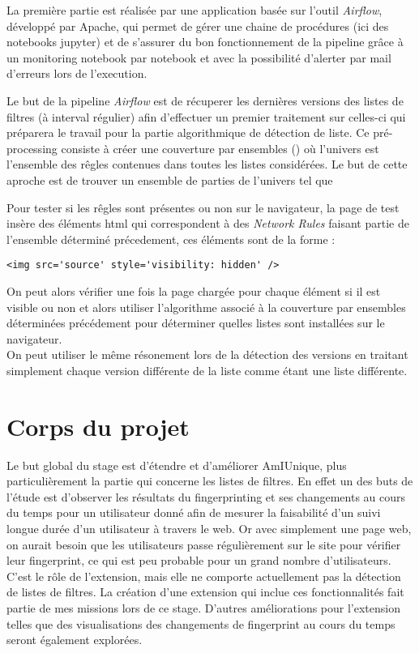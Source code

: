 \documentclass[oneside,a4paper,12pt]{article}
\begin{document}
La première partie est réalisée par une application basée sur l'outil \textit{Airflow}, développé par Apache, qui permet de gérer une chaine de procédures (ici des notebooks jupyter) et de s'assurer du bon fonctionnement de la pipeline grâce à un monitoring notebook par notebook et avec la possibilité d'alerter par mail d'erreurs lors de l'execution.

Le but de la pipeline \textit{Airflow} est de récuperer les dernières versions des listes de filtres (à interval régulier) afin d'effectuer un premier traitement sur celles-ci qui préparera le travail pour la partie algorithmique de détection de liste. Ce pré-processing consiste à créer une couverture par ensembles (\cite{setcover}) où l'univers est l'ensemble des rêgles contenues dans toutes les listes considérées. Le but de cette aproche est de trouver un ensemble de parties de l'univers tel que 


Pour tester si les rêgles sont présentes ou non sur le navigateur, la page de test insère des éléments html qui correspondent à des \textit{Network Rules} faisant partie de l'ensemble déterminé précedement, ces éléments sont de la forme :
\begin{center}
	\lstinline{<img src='source' style='visibility: hidden' />}
\end{center}
On peut alors vérifier une fois la page chargée pour chaque élément si il est visible ou non et alors utiliser l'algorithme associé à la couverture par ensembles déterminées précédement pour déterminer quelles listes sont installées sur le navigateur.\\

On peut utiliser le même résonement lors de la détection des versions en traitant simplement chaque version différente de la liste comme étant une liste différente.


\section{Corps du projet}\label{Projet}

Le but global du stage est d'étendre et d'améliorer AmIUnique, plus particulièrement la partie qui concerne les listes de filtres. En effet un des buts de l'étude est d'observer les résultats du fingerprinting et ses changements au cours du temps pour un utilisateur donné afin de mesurer la faisabilité d'un suivi longue durée d'un utilisateur à travers le web.
Or avec simplement une page web, on aurait besoin que les utilisateurs passe régulièrement sur le site pour vérifier leur fingerprint, ce qui est peu probable pour un grand nombre d'utilisateurs.
C'est le rôle de l'extension, mais elle ne comporte actuellement pas la détection de listes de filtres. La création d'une extension qui inclue ces fonctionnalités fait partie de mes missions lors de ce stage. D'autres améliorations pour l'extension telles que des visualisations des changements de fingerprint au cours du temps seront également explorées.
\end{document}
